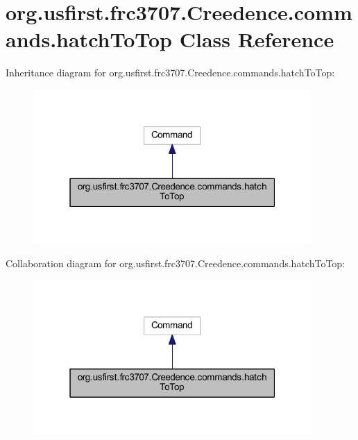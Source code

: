\hypertarget{classorg_1_1usfirst_1_1frc3707_1_1_creedence_1_1commands_1_1hatch_to_top}{}\section{org.\+usfirst.\+frc3707.\+Creedence.\+commands.\+hatch\+To\+Top Class Reference}
\label{classorg_1_1usfirst_1_1frc3707_1_1_creedence_1_1commands_1_1hatch_to_top}


Inheritance diagram for org.\+usfirst.\+frc3707.\+Creedence.\+commands.\+hatch\+To\+Top\+:
\nopagebreak
\begin{figure}[H]
\begin{center}
\leavevmode
\includegraphics[width=301pt]{classorg_1_1usfirst_1_1frc3707_1_1_creedence_1_1commands_1_1hatch_to_top__inherit__graph}
\end{center}
\end{figure}


Collaboration diagram for org.\+usfirst.\+frc3707.\+Creedence.\+commands.\+hatch\+To\+Top\+:
\nopagebreak
\begin{figure}[H]
\begin{center}
\leavevmode
\includegraphics[width=301pt]{classorg_1_1usfirst_1_1frc3707_1_1_creedence_1_1commands_1_1hatch_to_top__coll__graph}
\end{center}
\end{figure}
